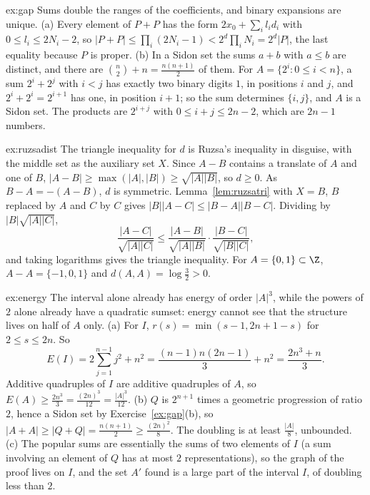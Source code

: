 \begin{solution}{ex:gap}
\idea Sums double the ranges of the coefficients, and binary expansions are unique.
\writeup (a) Every element of $P+P$ has the form $2x_0+\sum_il_id_i$ with $0\le l_i\le2N_i-2$, so $|P+P|\le\prod_i(2N_i-1)<2^d\prod_iN_i=2^d|P|$, the last equality because $P$ is proper.
(b) In a Sidon set the sums $a+b$ with $a\le b$ are distinct, and there are $\binom n2+n=\frac{n(n+1)}2$ of them. For $A=\{2^i:0\le i<n\}$, a sum $2^i+2^j$ with $i<j$ has exactly two binary digits $1$, in positions $i$ and $j$, and $2^i+2^i=2^{i+1}$ has one, in position $i+1$; so the sum determines $\{i,j\}$, and $A$ is a Sidon set. The products are $2^{i+j}$ with $0\le i+j\le2n-2$, which are $2n-1$ numbers.
\end{solution}

\begin{solution}{ex:ruzsadist}
\idea The triangle inequality for $d$ is Ruzsa's inequality in disguise, with the middle set as the auxiliary set $X$.
\writeup Since $A-B$ contains a translate of $A$ and one of $B$, $|A-B|\ge\max(|A|,|B|)\ge\sqrt{|A||B|}$, so $d\ge0$. As $B-A=-(A-B)$, $d$ is symmetric. Lemma~\ref{lem:ruzsatri} with $X=B$, $B$ replaced by $A$ and $C$ by $C$ gives $|B||A-C|\le|B-A||B-C|$. Dividing by $|B|\sqrt{|A||C|}$,
\[
\frac{|A-C|}{\sqrt{|A||C|}}\le\frac{|A-B|}{\sqrt{|A||B|}}\cdot\frac{|B-C|}{\sqrt{|B||C|}},
\]
and taking logarithms gives the triangle inequality. For $A=\{0,1\}\subset\Z$, $A-A=\{-1,0,1\}$ and $d(A,A)=\log\frac32>0$.
\end{solution}

\begin{solution}{ex:energy}
\idea The interval alone already has energy of order $|A|^3$, while the powers of $2$ alone already have a quadratic sumset: energy cannot see that the structure lives on half of $A$ only.
\writeup (a) For $I$, $r(s)=\min(s-1,2n+1-s)$ for $2\le s\le2n$. So
\[
E(I)=2\sum_{j=1}^{n-1}j^2+n^2=\frac{(n-1)n(2n-1)}3+n^2=\frac{2n^3+n}3.
\]
Additive quadruples of $I$ are additive quadruples of $A$, so $E(A)\ge\frac{2n^3}3=\frac{(2n)^3}{12}=\frac{|A|^3}{12}$.
(b) $Q$ is $2^{n+1}$ times a geometric progression of ratio $2$, hence a Sidon set by Exercise~\ref{ex:gap}(b), so $|A+A|\ge|Q+Q|=\frac{n(n+1)}2\ge\frac{(2n)^2}8$. The doubling is at least $\frac{|A|}8$, unbounded.
(c) The popular sums are essentially the sums of two elements of $I$ (a sum involving an element of $Q$ has at most $2$ representations), so the graph of the proof lives on $I$, and the set $A'$ found is a large part of the interval $I$, of doubling less than $2$.
\end{solution}

